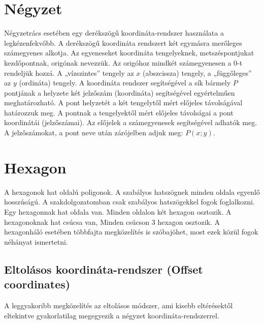 
\section{Négyzet}

Négyzetrács esetében egy derékszögű koordináta-rendszer használata a legkézenfekvőbb. 
\newline
\newline A derékszögű koordináta rendszert két egymásra merőleges számegyenes alkotja. Az egyeneseket koordináta tengelyeknek, metszéspontjukat kezdőpontnak, origónak nevezzük. Az origóhoz mindkét számegyenesen a $0$-t rendeljük hozzá. A „vízszintes” tengely az $x$ (abszcissza) tengely, a „függőleges” az $y$ (ordináta) tengely.
\newline
\newline A koordináta rendszer segítségével a sík bármely $P$ pontjának a helyzete két jelzőszám (koordináta) segítségével egyértelműen meghatározható. A pont helyzetét a két tengelytől mért előjeles távolságával határozzuk meg. A pontnak a tengelyektől mért előjeles távolságai a pont koordinátái (jelzőszámai). Az előjelek a számegyenesek segítségével adhatók meg. A jelzőszámokat, a pont neve után zárójelben adjuk meg: $P(x;y)$.

\section{Hexagon}

A hexagonok hat oldalú poligonok. A szabályos hatszögnek minden oldala egyenlő hosszúságú. A szakdolgozatomban csak szabályos hatszögekkel fogok foglalkozni. 
\newline
\newline Egy hexagonnak hat oldala van. Minden oldalon két hexagon osztozik. A hexagonoknak hat csúcsa van, Minden csúcson 3 hexagon osztozik.
\newline
\newline A hexagonháló esetében többfajta megközelítés is szóbajöhet, most ezek közül fogok néhányat ismertetni. 

\subsection{Eltolásos koordináta-rendszer (Offset coordinates)}

A leggyakoribb megközelítés az eltolásos módszer, ami kisebb eltérésektől eltekintve gyakorlatilag megegyezik a négyzet koordináta-rendszerrel. 
\newline
\newline\newline

